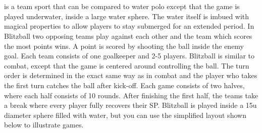 %
\\\\
%
 is a team sport that can be compared to water polo except that the game is played underwater, inside a large water sphere.
The water itself is imbued with magical properties to allow players to stay submerged for an extended period.
In Blitzball two opposing teams play against each other and the team which scores the most points wins.
A point is scored by shooting the ball inside the enemy goal. 
Each team consists of one goalkeeper and 2-5 players. 
Blitzball is similar to combat, except that the game is centered around controlling the ball.
The turn order is determined in the exact same way as in combat and the player who takes the first turn catches the ball after kick-off.
Each game consists of two halves, where each half consists of 10 rounds.
After finishing the first half, the teams take a break where every player fully recovers their SP.
Blitzball is played inside a 15u diameter sphere filled with water, but you can use the simplified layout shown below to illustrate games.
%
\vfill
%

